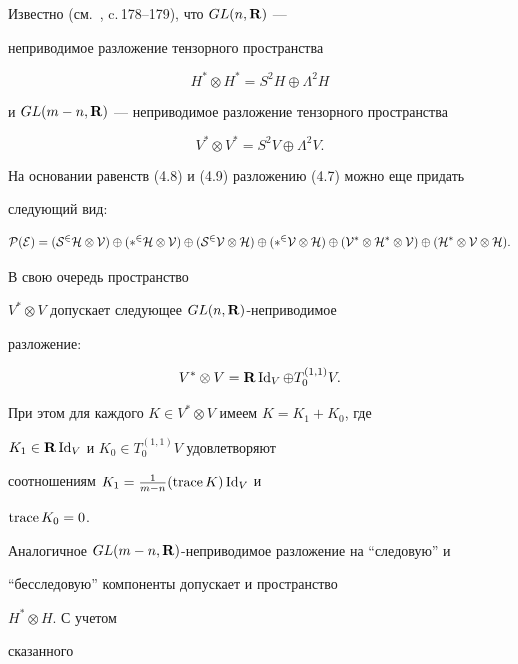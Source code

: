 Известно (см.~\cite{13}, c.\,178--179), что $GL(n,\bold R)$ ---


неприводимое разложение тензорного пространства 


\begin{equation} 


H^*\otimes H^*=S^2H\oplus\Lambda^2H 


\end{equation} 


и $GL(m-n,\bold R)$ --- неприводимое разложение тензорного пространства 


\begin{equation} 


V^*\otimes V^*=S^2V\oplus\Lambda^2V. 


\end{equation} 


На основании равенств (4.8) и (4.9) разложению (4.7) можно еще придать 


следующий вид: 


$$ 


\cal P(E)=(S^2H\otimes V)\oplus(\Lambda^2H\otimes V)\oplus 


(S^2V\otimes H)\oplus(\Lambda^2V\otimes H)\oplus 


(V^*\otimes H^*\otimes V)\oplus(H^*\otimes V\otimes H). 


$$ 


В свою очередь пространство 


$V^*\otimes V$ допускает следующее $GL(n,\bold R)$-неприводимое 


разложение: 


$$ 


V^*\otimes V=\bold R\Id_V\oplus T^{(1,1)}_0V. 


$$ 


При этом для каждого $K\in V^*\otimes V$ имеем $K=K_1+K_0$, где 


$K_1\in\bold R\operatorname{Id}_V$ и $K_0\in T^{(1,1)}_0V$ удовлетворяют


соотношениям $K_1=\frac{1}{m-n}(\operatorname{trace} K)\operatorname{Id}_V$ и 


$\operatorname{trace} K_0=0$. 


 


Аналогичное $GL(m-n,\bold R)$-неприводимое разложение на ``следовую'' и 


``бесследовую'' компоненты допускает и пространство 


$H^*\otimes H$. С учетом 


сказанного 


